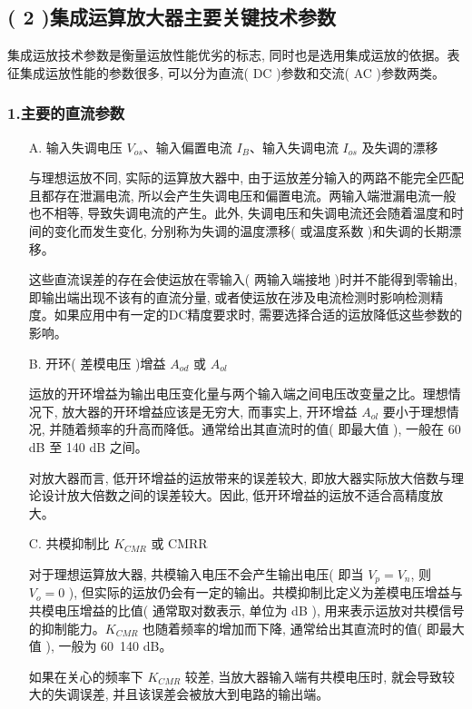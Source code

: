 \documentclass[10pt, a4paper]{article} %
\begin{document}
\subsection*{( 2 )集成运算放大器主要关键技术参数}

集成运放技术参数是衡量运放性能优劣的标志, 同时也是选用集成运放的依据。表征集成运放性能的参数很多, 可以分为直流( DC )参数和交流( AC )参数两类。

\subsubsection*{1.主要的直流参数}

\begin{itemize}
    \item[A.] 输入失调电压 $V_{os}$、输入偏置电流 $I_B$、输入失调电流 $I_{os}$ 及失调的漂移
    
    与理想运放不同, 实际的运算放大器中, 由于运放差分输入的两路不能完全匹配且都存在泄漏电流, 所以会产生失调电压和偏置电流。两输入端泄漏电流一般也不相等, 导致失调电流的产生。此外, 失调电压和失调电流还会随着温度和时间的变化而发生变化, 分别称为失调的温度漂移( 或温度系数 )和失调的长期漂移。
    
    这些直流误差的存在会使运放在零输入( 两输入端接地 )时并不能得到零输出, 即输出端出现不该有的直流分量, 或者使运放在涉及电流检测时影响检测精度。如果应用中有一定的DC精度要求时, 需要选择合适的运放降低这些参数的影响。

    \item[B.] 开环( 差模电压 )增益 $A_{od}$ 或 $A_{ol}$
    
    运放的开环增益为输出电压变化量与两个输入端之间电压改变量之比。理想情况下, 放大器的开环增益应该是无穷大, 而事实上, 开环增益 $A_{ol}$ 要小于理想情况, 并随着频率的升高而降低。通常给出其直流时的值( 即最大值 ), 一般在 60 dB 至 140 dB 之间。

    对放大器而言, 低开环增益的运放带来的误差较大, 即放大器实际放大倍数与理论设计放大倍数之间的误差较大。因此, 低开环增益的运放不适合高精度放大。

    \item[C.] 共模抑制比 $K_{CMR}$ 或 CMRR

    对于理想运算放大器, 共模输入电压不会产生输出电压( 即当 $V_p = V_n$, 则 $V_o = 0$ ), 但实际的运放仍会有一定的输出。共模抑制比定义为差模电压增益与共模电压增益的比值( 通常取对数表示, 单位为 dB ), 用来表示运放对共模信号的抑制能力。$K_{CMR}$ 也随着频率的增加而下降, 通常给出其直流时的值( 即最大值 ), 一般为 60~140 dB。

    如果在关心的频率下 $K_{CMR}$ 较差, 当放大器输入端有共模电压时, 就会导致较大的失调误差, 并且该误差会被放大到电路的输出端。

\end{itemize}
\end{document}
